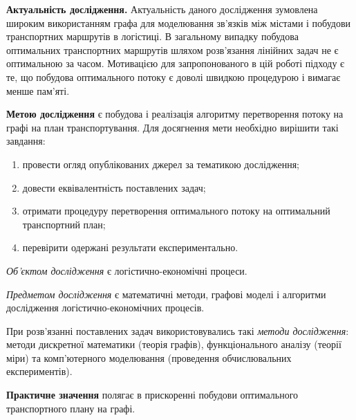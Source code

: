 
\textbf{Актуальність дослідження.} Актуальність даного дослідження зумовлена широким використанням графа для моделювання
зв'язків між містами і побудови транспортних маршрутів в логістиці. В загальному випадку побудова оптимальних транспортних
маршрутів шляхом розв'язання лінійних задач не є оптимальною за часом. Мотивацією для запропонованого в цій роботі підходу
є те, що побудова оптимального потоку є доволі швидкою процедурою і вимагає менше пам'яті.

\textbf{Метою дослідження} є побудова і реалізація алгоритму перетворення потоку на графі на план транспортування. Для
досягнення мети необхідно вирішити такі завдання:

\begin{enumerate}
    \item провести огляд опублікованих джерел за тематикою дослідження;
    \item довести еквівалентність поставлених задач;
    \item отримати процедуру перетворення оптимального потоку на оптимальний транспортний план;
    \item перевірити одержані результати експериментально.
\end{enumerate}

\textit{Об'єктом дослідження} є логістично-економічні процеси.

\textit{Предметом дослідження} є математичні методи, графові моделі і алгоритми дослідження логістично-економічних процесів.

При розв'язанні поставлених задач використовувались такі \textit{методи дослідження}: методи дискретної математики (теорія графів),
функціонального аналізу (теорії міри) та комп'ютерного моделювання (проведення обчислювальних експериментів).

\textbf{Практичне значення} полягає в прискоренні побудови оптимального транспортного плану на графі.